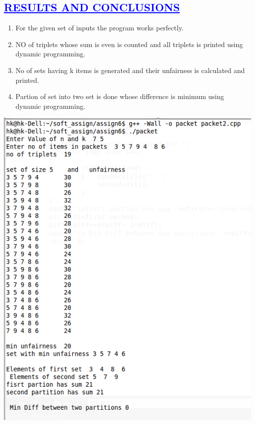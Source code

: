\documentclass[a4paper,12pt]{report}
\begin{document}
\begin{center}
\chapter{\textcolor{blue}{\underline {RESULTS AND CONCLUSIONS}}}
\end{center}
\begin{enumerate}
 
\item For the given set of inputs the program works perfectly.
\item NO of triplets whose sum is even is counted and all triplets is printed using dynamic programming.
\item No of sets having k items is generated and  their unfairness is calculated and printed.
\item Partion of set into two set is done whose difference is minimum using dynamic programming.
\end{enumerate}



\begin{center}
 \includegraphics[width=15 cm,height=11 cm]{./output.png}
\end{center}
\end{document}
